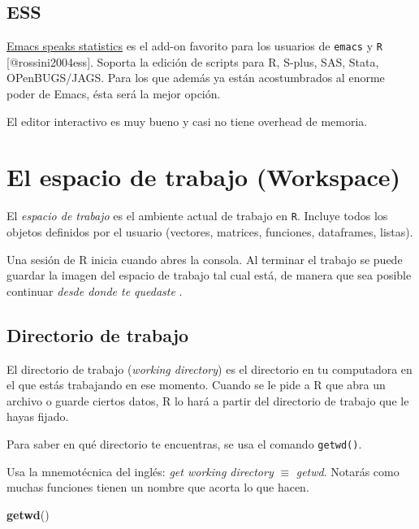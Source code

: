 \documentclass[]{article}
\newenvironment{Shaded}{\begin{snugshade}}{\end{snugshade}}
\newcommand{\KeywordTok}[1]{\textcolor[rgb]{0.13,0.29,0.53}{\textbf{{#1}}}}
\newcommand{\NormalTok}[1]{{#1}}
\begin{document}
\subsection{ESS}\label{ess}

\href{http://ess.r-project.org/}{Emacs speaks statistics} es el add-on
favorito para los usuarios de \texttt{emacs} y \texttt{R}
{[}@rossini2004ess{]}. Soporta la edición de scripts para R, S-plus,
SAS, Stata, OPenBUGS/JAGS. Para los que además ya están acostumbrados al
enorme poder de Emacs, ésta será la mejor opción.

El editor interactivo es muy bueno y casi no tiene overhead de memoria.

\section{El espacio de trabajo
(Workspace)}\label{el-espacio-de-trabajo-workspace}

El \emph{espacio de trabajo} es el ambiente actual de trabajo en
\texttt{R}. Incluye todos los objetos definidos por el usuario
(vectores, matrices, funciones, dataframes, listas).

Una sesión de R inicia cuando abres la consola. Al terminar el trabajo
se puede guardar la imagen del espacio de trabajo tal cual está, de
manera que sea posible continuar \emph{desde donde te quedaste}
\parencite[][p. 11]{kabacoff2015r}.

\subsection{Directorio de trabajo}\label{directorio-de-trabajo}

El directorio de trabajo (\emph{working directory}) es el directorio en
tu computadora en el que estás trabajando en ese momento. Cuando se le
pide a R que abra un archivo o guarde ciertos datos, R lo hará a partir
del directorio de trabajo que le hayas fijado.

Para saber en qué directorio te encuentras, se usa el comando
\texttt{getwd()}.

\begin{curiosidad} 
Usa la mnemotécnica del inglés: \textit{get working directory} $\equiv$ \textit{getwd}. 
Notarás como muchas funciones tienen un nombre que acorta lo que hacen.
\end{curiosidad}

\begin{Shaded}
\begin{Highlighting}[]
\KeywordTok{getwd}\NormalTok{()}
\end{Highlighting}
\end{Shaded}
\end{document}
